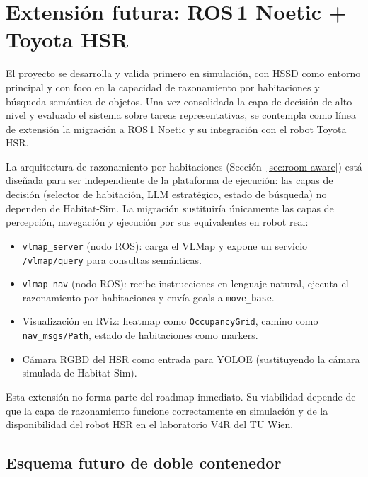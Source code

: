 \documentclass[11pt,a4paper]{article}
\begin{document}
\section{Extensión futura: ROS\,1 Noetic + Toyota HSR}

El proyecto se desarrolla y valida primero en simulación, con HSSD como
entorno principal y con foco en la capacidad de razonamiento por habitaciones
y búsqueda semántica de objetos. Una vez consolidada la capa de decisión de
alto nivel y evaluado el sistema sobre tareas representativas, se contempla
como línea de extensión la migración a ROS\,1 Noetic y su integración con el
robot Toyota HSR.

La arquitectura de razonamiento por habitaciones (Sección~\ref{sec:room-aware})
está diseñada para ser independiente de la plataforma de ejecución: las
capas de decisión (selector de habitación, LLM estratégico, estado de
búsqueda) no dependen de Habitat-Sim. La migración sustituiría únicamente
las capas de percepción, navegación y ejecución por sus equivalentes en
robot real:

\begin{itemize}
  \item \texttt{vlmap\_server} (nodo ROS): carga el VLMap y expone un
        servicio \texttt{/vlmap/query} para consultas semánticas.
  \item \texttt{vlmap\_nav} (nodo ROS): recibe instrucciones en lenguaje
        natural, ejecuta el razonamiento por habitaciones y envía goals a
        \texttt{move\_base}.
  \item Visualización en RViz: heatmap como \texttt{OccupancyGrid}, camino
        como \texttt{nav\_msgs/Path}, estado de habitaciones como markers.
  \item Cámara RGBD del HSR como entrada para YOLOE (sustituyendo la cámara
        simulada de Habitat-Sim).
\end{itemize}

Esta extensión no forma parte del roadmap inmediato. Su viabilidad depende
de que la capa de razonamiento funcione correctamente en simulación y de la
disponibilidad del robot HSR en el laboratorio V4R del TU Wien.

\subsection*{Esquema futuro de doble contenedor}
\end{document}
